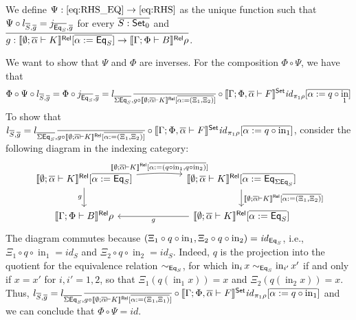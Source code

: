 \documentclass{lmcs}
\theoremstyle{plain}\newtheorem{satz}[thm]{Satz}
\newcommand{\set}{\mathsf{Set}}
\renewcommand{\id}{\mathit{id}}
\DeclareMathOperator{\SumIn}{in}
\begin{document}
We define $\Psi : \eqref{eq:RHS_EQ} \to \eqref{eq:RHS}$ as the unique function such that $\Psi \circ l_{\overline{S}, \overline{g}} = j_{\overline{\mathsf{Eq}_S}, \overline{g}}$ for every $\ol{S : \set_0}$ and $\overline{g : \llbracket{\emptyset; \overline{\alpha} \vdash K}\rrbracket^{\mathsf{Rel}}[\overline{\alpha := \mathsf{Eq}_S}] \to \llbracket{\Gamma; \Phi \vdash B}\rrbracket^{\mathsf{Rel}}\rho}$.

We want to show that $\Psi$ and $\Phi$ are inverses.
For the composition $\Phi \circ \Psi$, we have that
\[
\Phi \circ \Psi \circ l_{\ol{S}, \ol{g}}
= \Phi \circ j_{\ol{\Eq_S}, \ol{g}}
= l_{\ol{\Sigma{\Eq_S}}, \ol{g \circ \relsem{\emptyset; \ol\alpha \vdash K}[\ol{\alpha := (\Xi_1, \Xi_2)}]}} \circ \setsem{\Gamma; \Phi, \ol\alpha \vdash F} \id_{\pi_1 \rho}[\ol{\alpha := q \circ \SumIn_1}]
\]
To show that $l_{\ol{S}, \ol{g}} = l_{\ol{\Sigma{\Eq_S}}, \ol{g \circ \relsem{\emptyset; \ol\alpha \vdash K}[\ol{\alpha := (\Xi_1, \Xi_2)}]}} \circ \setsem{\Gamma; \Phi, \ol\alpha \vdash F} \id_{\pi_1 \rho}[\ol{\alpha := q \circ \SumIn_1}]$, consider the following diagram in the indexing category:
\[
\begin{tikzcd}[column sep = huge]
\relsem{\emptyset; \ol{\alpha} \vdash K}[\ol{\alpha := \Eq_S}]
\ar[r, bend left = 5, "{\relsem{\emptyset; \ol{\alpha} \vdash K}[\ol{\alpha := (q \circ \SumIn_1, q \circ \SumIn_2)}]}"]
\ar[d, "{g}"']
& \relsem{\emptyset; \ol{\alpha} \vdash K}[\ol{\alpha := \Eq_{\Sigma{\Eq_S}}}]
\ar[d, "{\relsem{\emptyset; \ol{\alpha} \vdash K}[\ol{\alpha := (\Xi_1, \Xi_2)}]}"] \\
\relsem{\Gamma; \Phi \vdash B}\rho
& \relsem{\emptyset; \ol{\alpha} \vdash K}[\ol{\alpha := \Eq_{S}}]
\ar[l, "{g}"]
\end{tikzcd}
\]
The diagram commutes because $(\Xi_1 \circ q \circ \SumIn_1, \Xi_2 \circ q \circ \SumIn_2) = \id_{\Eq_S}$, i.e., $\Xi_1 \circ q \circ \SumIn_1 = \id_S$ and $\Xi_2 \circ q \circ \SumIn_2 = \id_S$.
Indeed, $q$ is the projection into the quotient for the equivalence relation $\sim_{\mathsf{Eq}_S}$, for which $\SumIn_i x \sim_{\Eq_S} \SumIn_{i'} x'$ if and only if $x = x'$ for $i, i' = 1, 2$, so that $\Xi_1 ( q ( \SumIn_1 x ) ) = x$ and $\Xi_2 ( q ( \SumIn_2 x ) ) = x$.
Thus, $l_{\ol{S}, \ol{g}} = l_{\ol{\Sigma{\Eq_S}}, \ol{g \circ \relsem{\emptyset; \ol\alpha \vdash K}[\ol{\alpha := (\Xi_1, \Xi_1)}]}} \circ \setsem{\Gamma; \Phi, \ol\alpha \vdash F} \id_{\pi_1 \rho}[\ol{\alpha := q \circ \SumIn_1}]$
and we can conclude that $\Phi \circ \Psi = \id$.
\end{document}
